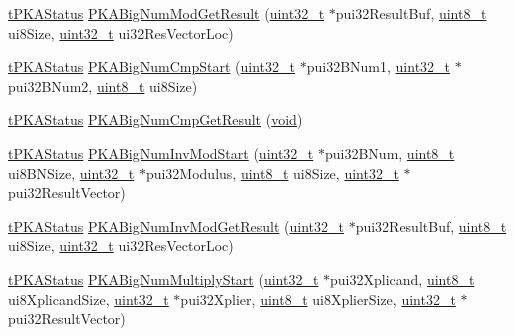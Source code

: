 \begin{DoxyCompactItemize}
\item 
\hyperlink{pka_8h_a94af1eb5fa0257508f865b5e40de4ed3}{t\+P\+K\+A\+Status} \hyperlink{group__pka__driver_ga23ee9b245d913950bdab98fb80e72f16}{P\+K\+A\+Big\+Num\+Mod\+Get\+Result} (\hyperlink{_p_e___types_8h_a33594304e786b158f3fb30289278f5af}{uint32\+\_\+t} $\ast$pui32\+Result\+Buf, \hyperlink{_p_e___types_8h_aba7bc1797add20fe3efdf37ced1182c5}{uint8\+\_\+t} ui8\+Size, \hyperlink{_p_e___types_8h_a33594304e786b158f3fb30289278f5af}{uint32\+\_\+t} ui32\+Res\+Vector\+Loc)
\item 
\hyperlink{pka_8h_a94af1eb5fa0257508f865b5e40de4ed3}{t\+P\+K\+A\+Status} \hyperlink{group__pka__driver_ga6b8827a49b626e7c90608ecbbc59e2b0}{P\+K\+A\+Big\+Num\+Cmp\+Start} (\hyperlink{_p_e___types_8h_a33594304e786b158f3fb30289278f5af}{uint32\+\_\+t} $\ast$pui32\+B\+Num1, \hyperlink{_p_e___types_8h_a33594304e786b158f3fb30289278f5af}{uint32\+\_\+t} $\ast$pui32\+B\+Num2, \hyperlink{_p_e___types_8h_aba7bc1797add20fe3efdf37ced1182c5}{uint8\+\_\+t} ui8\+Size)
\item 
\hyperlink{pka_8h_a94af1eb5fa0257508f865b5e40de4ed3}{t\+P\+K\+A\+Status} \hyperlink{group__pka__driver_ga0b7348fb8033dfcb8a1584dfb064bf3f}{P\+K\+A\+Big\+Num\+Cmp\+Get\+Result} (\hyperlink{usb__devapi_8h_afabf60e7f57651d6d595a02c75f07cd0}{void})
\item 
\hyperlink{pka_8h_a94af1eb5fa0257508f865b5e40de4ed3}{t\+P\+K\+A\+Status} \hyperlink{group__pka__driver_ga789ed728264b5f3d5b411ca72615e470}{P\+K\+A\+Big\+Num\+Inv\+Mod\+Start} (\hyperlink{_p_e___types_8h_a33594304e786b158f3fb30289278f5af}{uint32\+\_\+t} $\ast$pui32\+B\+Num, \hyperlink{_p_e___types_8h_aba7bc1797add20fe3efdf37ced1182c5}{uint8\+\_\+t} ui8\+B\+N\+Size, \hyperlink{_p_e___types_8h_a33594304e786b158f3fb30289278f5af}{uint32\+\_\+t} $\ast$pui32\+Modulus, \hyperlink{_p_e___types_8h_aba7bc1797add20fe3efdf37ced1182c5}{uint8\+\_\+t} ui8\+Size, \hyperlink{_p_e___types_8h_a33594304e786b158f3fb30289278f5af}{uint32\+\_\+t} $\ast$pui32\+Result\+Vector)
\item 
\hyperlink{pka_8h_a94af1eb5fa0257508f865b5e40de4ed3}{t\+P\+K\+A\+Status} \hyperlink{group__pka__driver_gaeb5b970ba8ccea84761f2b84ffc3408e}{P\+K\+A\+Big\+Num\+Inv\+Mod\+Get\+Result} (\hyperlink{_p_e___types_8h_a33594304e786b158f3fb30289278f5af}{uint32\+\_\+t} $\ast$pui32\+Result\+Buf, \hyperlink{_p_e___types_8h_aba7bc1797add20fe3efdf37ced1182c5}{uint8\+\_\+t} ui8\+Size, \hyperlink{_p_e___types_8h_a33594304e786b158f3fb30289278f5af}{uint32\+\_\+t} ui32\+Res\+Vector\+Loc)
\item 
\hyperlink{pka_8h_a94af1eb5fa0257508f865b5e40de4ed3}{t\+P\+K\+A\+Status} \hyperlink{group__pka__driver_gab72dd0782a8e971133dfc94b267881a1}{P\+K\+A\+Big\+Num\+Multiply\+Start} (\hyperlink{_p_e___types_8h_a33594304e786b158f3fb30289278f5af}{uint32\+\_\+t} $\ast$pui32\+Xplicand, \hyperlink{_p_e___types_8h_aba7bc1797add20fe3efdf37ced1182c5}{uint8\+\_\+t} ui8\+Xplicand\+Size, \hyperlink{_p_e___types_8h_a33594304e786b158f3fb30289278f5af}{uint32\+\_\+t} $\ast$pui32\+Xplier, \hyperlink{_p_e___types_8h_aba7bc1797add20fe3efdf37ced1182c5}{uint8\+\_\+t} ui8\+Xplier\+Size, \hyperlink{_p_e___types_8h_a33594304e786b158f3fb30289278f5af}{uint32\+\_\+t} $\ast$pui32\+Result\+Vector)

\end{DoxyCompactItemize}
